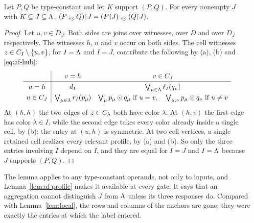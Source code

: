 \begin{lemma}\label{lem:af-local}
Let $P,Q$ be type-constant and let $K$ support $(P,Q)$. For every
nonempty $J$ with $K\subseteq J\subseteq\Lambda$,
$(P\mathbin{;_{\odot}} Q)\mathord{\restriction} J=(P\mathord{\restriction} J)\mathbin{;_{\odot}}(Q\mathord{\restriction} J)$.
\end{lemma}
\begin{proof}
Let $u,v\in D_J$. Both sides are joins over witnesses, over $D$ and over
$D_J$ respectively. The witnesses $h$, $u$ and $v$ occur on both sides.
The cell witnesses $z\in C_{I}\setminus\{u,v\}$, for $I=\Lambda$ and $I=J$,
contribute the following by (a), (b) and \eqref{eq:af-hub}:
\[
\renewcommand{\arraystretch}{1.3}
\begin{array}{c|cc}
 & v=h & v\in\cell J\\\hline
 u=h & d_I & \bigvee_{\mu\in\Col}\ell_I(q_\mu)\\
 u\in\cell J & \bigvee_{\mu\in\Col}r_I(p_\mu)
     & \bigvee_{\mu}p_\mu\odot q_\mu\ \text{if }u=v,\quad
       \bigvee_{\mu,\nu}p_\mu\odot q_\nu\ \text{if }u\ne v
\end{array}
\]
At $(h,h)$ the two edges of $z\in C_{\lambda}$ both have color $\lambda$.
At $(h,v)$ the first edge has color $\lambda\in I$, while the second edge
takes every color already inside a single cell, by (b); the entry at
$(u,h)$ is symmetric. At two cell vertices, a single retained cell
realizes every relevant profile, by (a) and (b). So only the three entries
involving $I$ depend on $I$, and they are equal for $I=J$ and $I=\Lambda$
because $J$ supports $(P,Q)$.
\end{proof}
The lemma applies to any type-constant operands, not only to inputs, and
Lemma~\ref{lem:af-profile} makes it available at every gate. It says that
an aggregation cannot distinguish $J$ from $\Lambda$ unless its three
responses do. Compared with Lemma~\ref{lem:local}, the rows and columns of
the anchors are gone; they were exactly the entries at which the label
entered.

